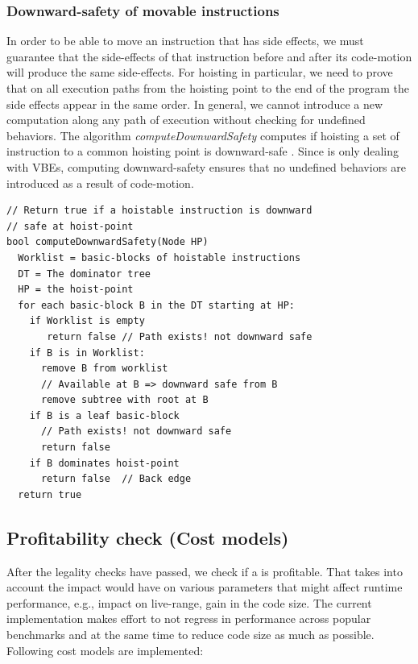 \documentclass[sigplan,10pt,review,anonymous]{acmart}\settopmatter{printfolios=true,printccs=false,printacmref=false}
\begin{document}
\subsubsection{Downward-safety of movable instructions}

In order to be able to move an instruction that has side effects, we must
guarantee that the side-effects of that instruction before and after its
code-motion will produce the same side-effects.  For hoisting in particular, we
need to prove that on all execution paths from the hoisting point to the end of
the program the side effects appear in the same order. In general, we cannot
introduce a new computation along any path of execution without checking for
undefined behaviors. The algorithm \emph{computeDownwardSafety} computes if
hoisting a set of instruction to a common hoisting point is downward-safe
\cite{steven1997advanced}. Since \GCM{} is only dealing with VBEs, computing
downward-safety ensures that no undefined behaviors are introduced as a result
of code-motion.
\newline
\begin{verbatim}
// Return true if a hoistable instruction is downward
// safe at hoist-point
bool computeDownwardSafety(Node HP)
  Worklist = basic-blocks of hoistable instructions
  DT = The dominator tree
  HP = the hoist-point
  for each basic-block B in the DT starting at HP:
    if Worklist is empty
       return false // Path exists! not downward safe
    if B is in Worklist:
      remove B from worklist
      // Available at B => downward safe from B
      remove subtree with root at B
    if B is a leaf basic-block
      // Path exists! not downward safe
      return false
    if B dominates hoist-point
      return false  // Back edge
  return true
\end{verbatim}

\subsection{Profitability check (Cost models)}
\label{subsec:cost-models}
After the legality checks have passed, we check if a \gcm{} is profitable.  That
takes into account the impact \gcm{} would have on various parameters that might
affect runtime performance, e.g., impact on live-range, gain in the code
size. The current implementation makes effort to not regress in performance
across popular benchmarks and at the same time to reduce code size as much as
possible. Following cost models are implemented:
\end{document}
